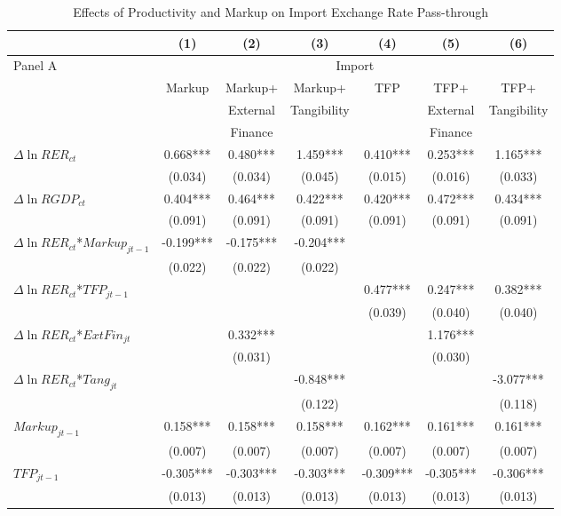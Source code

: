\begin{table}[htbp]
	\centering
	\caption{Effects of Productivity and Markup on Import Exchange Rate Pass-through}
	\begin{threeparttable}
	\begin{tabular}{lcccccc}
		\midrule          & (1)   & (2)   & (3)   & (4)   & (5)   & (6) \\
		\midrule
		Panel A & \multicolumn{6}{c}{Import} \\
		& Markup & Markup+ & Markup+ & TFP   & TFP+  & TFP+ \\
		&       & External & Tangibility &       & External & Tangibility \\
		&       & Finance &  	&       & Finance &  \\
		\midrule
		$\Delta \ln RER_{ct}$ & 0.668*** & 0.480*** & 1.459*** & 0.410*** & 0.253*** & 1.165*** \\
		& (0.034) & (0.034) & (0.045) & (0.015) & (0.016) & (0.033) \\
		$\Delta \ln RGDP_{ct}$ & 0.404*** & 0.464*** & 0.422*** & 0.420*** & 0.472*** & 0.434*** \\
		& (0.091) & (0.091) & (0.091) & (0.091) & (0.091) & (0.091) \\
		$\Delta \ln RER_{ct}$*$Markup_{jt-1}$ & -0.199*** & -0.175*** & -0.204*** &       &       &  \\
		& (0.022) & (0.022) & (0.022) &       &       &  \\
		$\Delta \ln RER_{ct}$*$TFP_{jt-1}$ &       &       &       & 0.477*** & 0.247*** & 0.382*** \\
		&       &       &       & (0.039) & (0.040) & (0.040) \\
		$\Delta \ln RER_{ct}$*$ExtFin_{jt}$ &       & 0.332*** &       &       & 1.176*** &  \\
		&       & (0.031) &       &       & (0.030) &  \\
		$\Delta \ln RER_{ct}$*$Tang_{jt}$ &       &       & -0.848*** &       &       & -3.077*** \\
		&       &       & (0.122) &       &       & (0.118) \\
		$Markup_{jt-1}$ & 0.158*** & 0.158*** & 0.158*** & 0.162*** & 0.161*** & 0.161*** \\
		& (0.007) & (0.007) & (0.007) & (0.007) & (0.007) & (0.007) \\
		$TFP_{jt-1}$ & -0.305*** & -0.303*** & -0.303*** & -0.309*** & -0.305*** & -0.306*** \\
		& (0.013) & (0.013) & (0.013) & (0.013) & (0.013) & (0.013) \\

\end{tabular}
\end{threeparttable}
\end{table}
